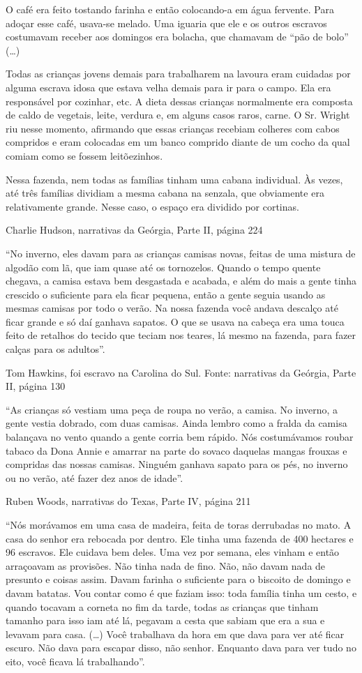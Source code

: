 O café era feito tostando farinha e então colocando-a em água fervente.
Para adoçar esse café, usava-se melado. Uma iguaria que ele e os outros
escravos costumavam receber aos domingos era bolacha, que chamavam de
``pão de bolo'' (\ldots{})

Todas as crianças jovens demais para trabalharem na lavoura eram
cuidadas por alguma escrava idosa que estava velha demais para ir para o
campo. Ela era responsável por cozinhar, etc. A dieta dessas crianças
normalmente era composta de caldo de vegetais, leite, verdura e, em
alguns casos raros, carne. O Sr. Wright riu nesse momento, afirmando que
essas crianças recebiam colheres com cabos compridos e eram colocadas em
um banco comprido diante de um cocho da qual comiam como se fossem
leitõezinhos.

Nessa fazenda, nem todas as famílias tinham uma cabana individual. Às
vezes, até três famílias dividiam a mesma cabana na senzala, que
obviamente era relativamente grande. Nesse caso, o espaço era dividido
por cortinas.

Charlie Hudson, narrativas da Geórgia, Parte II, página 224

``No inverno, eles davam para as crianças camisas novas, feitas de uma
mistura de algodão com lã, que iam quase até os tornozelos. Quando o
tempo quente chegava, a camisa estava bem desgastada e acabada, e além
do mais a gente tinha crescido o suficiente para ela ficar pequena,
então a gente seguia usando as mesmas camisas por todo o verão. Na nossa
fazenda você andava descalço até ficar grande e só daí ganhava sapatos.
O que se usava na cabeça era uma touca feito de retalhos do tecido que
teciam nos teares, lá mesmo na fazenda, para fazer calças para os
adultos''.

Tom Hawkins, foi escravo na Carolina do Sul. Fonte: narrativas da
Geórgia, Parte II, página 130

``As crianças só vestiam uma peça de roupa no verão, a camisa. No
inverno, a gente vestia dobrado, com duas camisas. Ainda lembro como a
fralda da camisa balançava no vento quando a gente corria bem rápido.
Nós costumávamos roubar tabaco da Dona Annie e amarrar na parte do
sovaco daquelas mangas frouxas e compridas das nossas camisas. Ninguém
ganhava sapato para os pés, no inverno ou no verão, até fazer dez anos
de idade''.

Ruben Woods, narrativas do Texas, Parte IV, página 211

``Nós morávamos em uma casa de madeira, feita de toras derrubadas no
mato. A casa do senhor era rebocada por dentro. Ele tinha uma fazenda de
400 hectares e 96 escravos. Ele cuidava bem deles. Uma vez por semana,
eles vinham e então arraçoavam as provisões. Não tinha nada de fino.
Não, não davam nada de presunto e coisas assim. Davam farinha o
suficiente para o biscoito de domingo e davam batatas. Vou contar como é
que faziam isso: toda família tinha um cesto, e quando tocavam a corneta
no fim da tarde, todas as crianças que tinham tamanho para isso iam até
lá, pegavam a cesta que sabiam que era a sua e levavam para casa.
(\ldots{}) Você trabalhava da hora em que dava para ver até ficar
escuro. Não dava para escapar disso, não senhor. Enquanto dava para ver
tudo no eito, você ficava lá trabalhando''.

